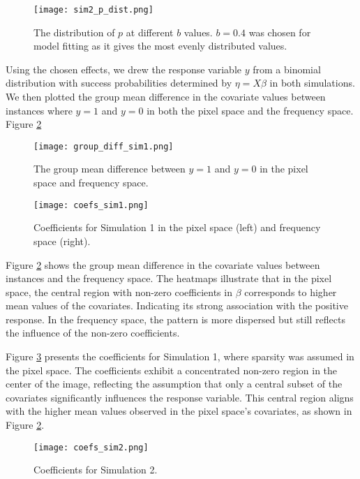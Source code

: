 \documentclass[12pt]{article}
\begin{document}
\begin{figure}[htbp] 
	\centering
	\texttt{[image: sim2\_p\_dist.png]} 
	\caption{The distribution of \(p\) at different \( b \) values. \( b = 0.4 \) was
chosen for model fitting as it gives the most evenly distributed values.}
	\label{fig:sim2_p_dist} 
\end{figure}

Using the chosen effects, we drew the response variable \( y \) from a
binomial distribution with success probabilities determined by \( \eta = X
\beta \) in both simulations. We then plotted the group mean difference in the
covariate values between instances where \( y=1 \) and \( y=0	\) in both the pixel space
and the frequency space. Figure \ref{fig:group_diff1} 

\begin{figure}[htbp]
	\centering
	\texttt{[image: group\_diff\_sim1.png]}
	\caption{The group mean difference between \( y = 1 \) and \( y = 0 \) in
	the pixel space and frequency space.}
	\label{fig:group_diff1}
\end{figure}

\begin{figure}[htbp]
	\centering
	\texttt{[image: coefs\_sim1.png]}
  \caption{Coefficients for Simulation 1 in the pixel space (left) and
	frequency space (right).}
  \label{fig:coefs_sim1}
\end{figure}

Figure \ref{fig:group_diff1} shows the group mean difference in the covariate
values between instances 
and the frequency space. The heatmaps illustrate that in the pixel space, the
central region with non-zero coefficients in \( \beta \) corresponds to higher
mean values of the covariates. Indicating its strong association with the
positive response. In the frequency space, the pattern is more dispersed but
still reflects the influence of the non-zero coefficients.

Figure \ref{fig:coefs_sim1} presents the coefficients for Simulation 1, where
sparsity was assumed in the pixel space. The coefficients exhibit a
concentrated non-zero region in the center of the image, reflecting the
assumption that only a central subset of the covariates significantly
influences the response variable. This central region aligns with the higher
mean values observed in the pixel space's covariates, as shown in Figure
\ref{fig:group_diff1}.


\begin{figure}[htbp]
	\centering
	\texttt{[image: coefs\_sim2.png]}
  \caption{Coefficients for Simulation 2.}
  \label{fig:coefs_sim2}
\end{figure}
\end{document}
